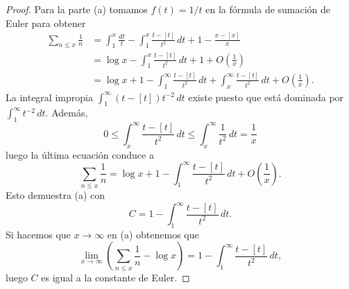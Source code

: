 \documentclass[12pt,a4paper]{book}
\begin{document}
    \begin{proof}
        Para la parte (a) tomamos $f(t)=1/t$ en la fórmula de sumación de Euler para
        obtener
        \begin{align*}
            \sum_{n\leq x}\frac{1}{n}&=\int_1^x\frac{dt}{t}-\int_1^x\frac{t-[t]}{t^2}\,dt
            +1-\frac{x-[x]}{x}\\
            &=\log x-\int_1^x\frac{t-[t]}{t^2}\,dt+1+O\left(\frac{1}{x}\right)\\
            &=\log x+1-\int_1^\infty\frac{t-[t]}{t^2}\,dt+\int_x^\infty\frac{t-[t]}{t^2}\,dt
            +O\left(\frac{1}{x}\right).
        \end{align*}
        La integral impropia $\int_1^\infty(t-[t])t^{-2}\,dt$ existe puesto que está
        dominada por $\int_1^\infty t^{-2}\,dt$. Además,
        \begin{equation*}
            0\leq\int_x^\infty\frac{t-[t]}{t^2}\,dt\leq\int_x^\infty\frac{1}{t^2}\,dt=\frac{1}{x}
        \end{equation*}
        luego la última ecuación conduce a
        \begin{equation*}
            \sum_{n\leq x}\frac{1}{n}=\log x+1-\int_1^\infty\frac{t-[t]}{t^2}\,dt
            +O\left(\frac{1}{x}\right).
        \end{equation*}
        Esto demuestra (a) con
        \begin{equation*}
            C=1-\int_1^\infty\frac{t-[t]}{t^2}\,dt.
        \end{equation*}
        Si hacemos que $x\to\infty$ en (a) obtenemos que
        \begin{equation*}
            \lim_{x\to\infty}\left(\sum_{n\leq x}\frac{1}{n}-\log x\right)
            =1-\int_1^\infty\frac{t-[t]}{t^2}\,dt,
        \end{equation*}
        luego $C$ es igual a la constante de Euler.


\end{proof}
\end{document}
